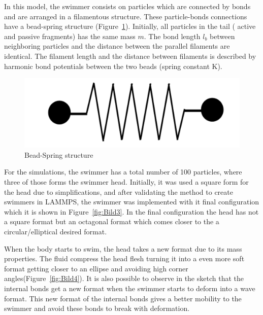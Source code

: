 In this model, the swimmer consists on particles which are connected by bonds and are arranged in a filamentous structure. These particle-bonds connections have a bead-spring 
structure (Figure~\ref{fig:Bild2}). Initially, all particles in the tail ( active and passive fragments) has the same mass $m$. The bond length $l_{b}$ between neighboring
particles and the distance between the parallel filaments are identical. The filament length and the distance between filaments is described by harmonic bond potentials between
the two beads (spring constant K).\par

\begin{figure}[ht]
\centering
  \begin{footnotesize}
  \includegraphics[scale=0.15]{images/bead-spring.png}
  \caption[Bead-Spring Structure]{Bead-Spring structure}
  \label{fig:Bild2}
  \end{footnotesize}
\end{figure} 

For the simulations, the swimmer has a total number of 100 particles, where three of those forms the swimmer head. Initially, it was used a square form for the head due to
simplifications, and after validating the method to create swimmers in LAMMPS, the swimmer was implemented with it final configuration which it is shown in Figure~\ref{fig:Bild3}.
In the final configuration the head has not a square format but an octagonal format which comes closer to the a circular/elliptical desired format.\par 
When the body starts to swim, the head takes a new format due to its mass properties. The fluid compress the head flesh turning it into a even more soft format getting closer to an 
ellipse and avoiding high corner angles(Figure~\ref{fig:Bild4}). It is also possible to observe in the sketch that the internal bonds get a new format when the swimmer starts to
deform into a wave format. This new format of the internal bonds gives a better mobility to the swimmer and avoid these bonds to break with deformation.  \par

